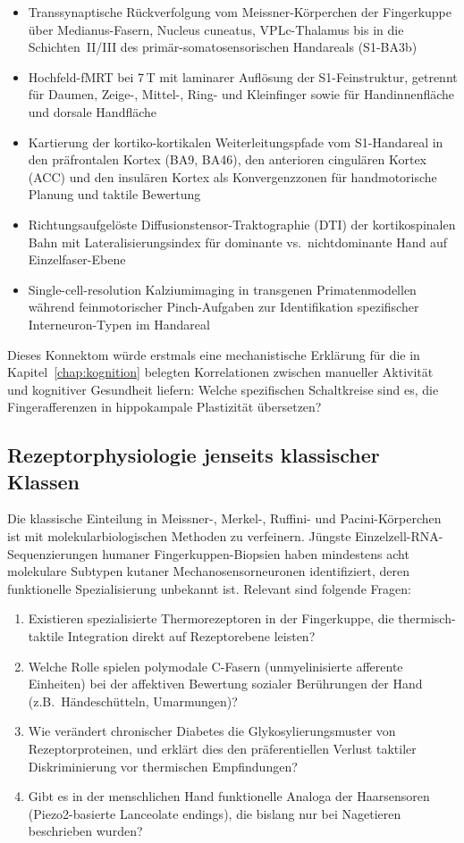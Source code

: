 ﻿\documentclass[12pt,a4paper]{report}
\theoremstyle{plain}
\theoremstyle{definition}
\theoremstyle{remark}
\begin{document}
\begin{itemize}
\item Transsynaptische Rückverfolgung vom Meissner-Körperchen der Fingerkuppe
  über Medianus-Fasern, Nucleus cuneatus, VPLc-Thalamus bis in die
  Schichten~II/III des primär-somatosensorischen Handareals (S1-BA3b)
\item Hochfeld-fMRT bei 7\,T mit laminarer Auflösung der S1-Feinstruktur,
  getrennt für Daumen, Zeige-, Mittel-, Ring- und Kleinfinger sowie
  für Handinnenfläche und dorsale Handfläche
\item Kartierung der kortiko-kortikalen Weiterleitungspfade vom
  S1-Handareal in den präfrontalen Kortex (BA9, BA46), den anterioren
  cingulären Kortex (ACC) und den insulären Kortex als Konvergenzzonen
  für handmotorische Planung und taktile Bewertung
\item Richtungsaufgelöste Diffusionstensor-Traktographie (DTI) der
  kortikospinalen Bahn mit Lateralisierungsindex für dominante vs.\
  nichtdominante Hand auf Einzelfaser-Ebene
\item Single-cell-resolution Kalziumimaging in transgenen Primatenmodellen
  während feinmotorischer Pinch-Aufgaben zur Identifikation spezifischer
  Interneuron-Typen im Handareal
\end{itemize}

Dieses Konnektom würde erstmals eine mechanistische Erklärung für die in
Kapitel~\ref{chap:kognition} belegten Korrelationen zwischen manueller
Aktivität und kognitiver Gesundheit liefern: Welche spezifischen Schaltkreise
sind es, die Fingerafferenzen in hippokampale Plastizität übersetzen?

\subsection{Rezeptorphysiologie jenseits klassischer Klassen}

Die klassische Einteilung in Meissner-, Merkel-, Ruffini- und
Pacini-Körperchen ist mit molekularbiologischen Methoden zu verfeinern.
Jüngste Einzelzell-RNA-Sequenzierungen humaner Fingerkuppen-Biopsien
haben mindestens acht molekulare Subtypen kutaner Mechanosensorneuronen
identifiziert, deren funktionelle Spezialisierung unbekannt ist.
Relevant sind folgende Fragen:

\begin{enumerate}
\item Existieren spezialisierte Thermorezeptoren in der Fingerkuppe,
  die thermisch-taktile Integration direkt auf Rezeptorebene leisten?
\item Welche Rolle spielen polymodale C-Fasern (unmyelinisierte afferente
  Einheiten) bei der affektiven Bewertung sozialer Berührungen der
  Hand (z.B.\ Händeschütteln, Umarmungen)?
\item Wie verändert chronischer Diabetes die Glykosylierungsmuster
  von Rezeptorproteinen, und erklärt dies den präferentiellen Verlust
  taktiler Diskriminierung vor thermischen Empfindungen?
\item Gibt es in der menschlichen Hand funktionelle Analoga der
  Haarsensoren (Piezo2-basierte Lanceolate endings), die bislang
  nur bei Nagetieren beschrieben wurden?
\end{enumerate}
\end{document}
